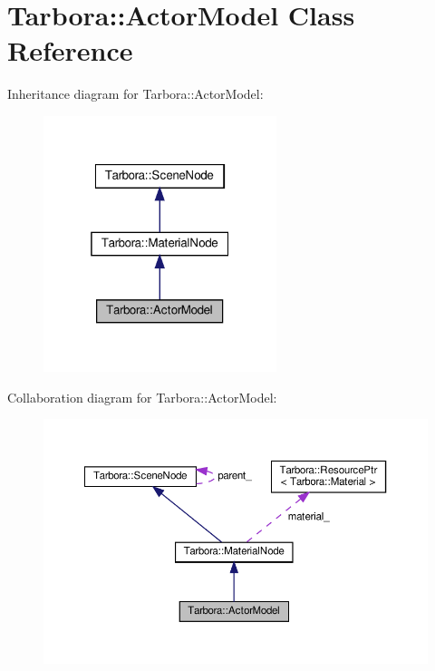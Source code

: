 \hypertarget{classTarbora_1_1ActorModel}{}\section{Tarbora\+:\+:Actor\+Model Class Reference}
\label{classTarbora_1_1ActorModel}


Inheritance diagram for Tarbora\+:\+:Actor\+Model\+:
\nopagebreak
\begin{figure}[H]
\begin{center}
\leavevmode
\includegraphics[width=193pt]{classTarbora_1_1ActorModel__inherit__graph}
\end{center}
\end{figure}


Collaboration diagram for Tarbora\+:\+:Actor\+Model\+:
\nopagebreak
\begin{figure}[H]
\begin{center}
\leavevmode
\includegraphics[width=350pt]{classTarbora_1_1ActorModel__coll__graph}
\end{center}
\end{figure}
